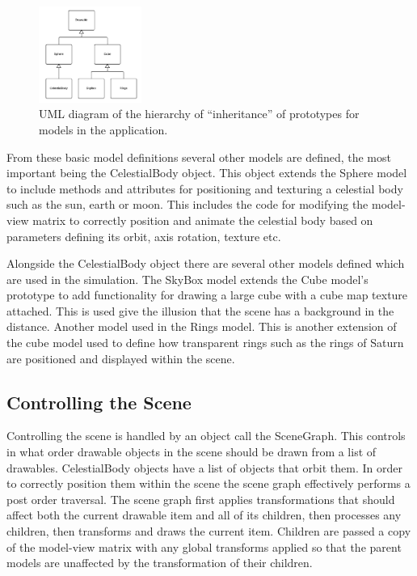 \documentclass[conference]{IEEEtran}
\begin{document}
\begin{figure}[!t]
\centering
\includegraphics[width=0.3\textwidth]{img/model-uml.png}
\caption{UML diagram of the hierarchy of ``inheritance'' of prototypes for models in the  application.}
\label{fig:uml-models}
\end{figure}

From these basic model definitions several other models are defined, the most important being the CelestialBody object. This object extends the Sphere model to include methods and attributes for positioning and texturing a celestial body such as the sun, earth or moon. This includes the code for modifying the model-view matrix to correctly position and animate the celestial body based on parameters defining its orbit, axis rotation, texture etc.

Alongside the CelestialBody object there are several other models defined which are used in the simulation. The SkyBox model extends the Cube model's prototype to add functionality for drawing a large cube with a cube map texture attached. This is used give the illusion that the scene has a background in the distance. Another model used in the Rings model. This is another extension of the cube model used to define how transparent rings such as the rings of Saturn are positioned and displayed within the scene.

\subsection{Controlling the Scene}
Controlling the scene is handled by an object call the SceneGraph. This controls in what order drawable objects in the scene should be drawn from a list of drawables. CelestialBody objects have a list of objects that orbit them. In order to correctly position them within the scene the scene graph effectively performs a post order traversal. The scene graph first applies transformations that should affect both the current drawable item and all of its children, then processes any children, then transforms and draws the current item. Children are passed a copy of the model-view matrix with any global transforms applied so that the parent models are unaffected by the transformation of their children.
\end{document}
